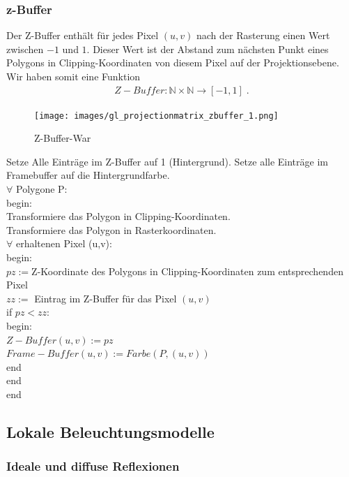 \subsubsection* {z-Buffer}
Der Z-Buffer enthält für jedes Pixel $(u,v)$ nach der Rasterung  einen Wert zwischen $-1$ und $1$. Dieser Wert  ist der Abstand zum nächsten Punkt eines Polygons  in Clipping-Koordinaten von diesem Pixel auf der Projektionsebene.  Wir haben somit eine Funktion
\begin{align*}
Z-Buffer : \mathbb{N} \times \mathbb{N} \to [-1,1]  \; .
\end{align*}

\begin{figure}[H]
    \centering
    \texttt{[image: images/gl\_projectionmatrix\_zbuffer\_1.png]}
    \caption{Z-Buffer-War}
    \label{fig:zbuffer-war}
\end{figure}



\begin{Algorithmus}
Setze Alle Einträge im Z-Buffer auf 1 (Hintergrund).
Setze alle Einträge im Framebuffer auf die Hintergrundfarbe. \\
$\forall$ Polygone P: \\
begin: \\
Transformiere das Polygon in Clipping-Koordinaten. \\
Transformiere das Polygon in Rasterkoordinaten. \\
$\forall$ erhaltenen Pixel (u,v): \\
begin: \\
$pz := $Z-Koordinate des Polygons in Clipping-Koordinaten zum entsprechenden Pixel \\
$zz:=$ Eintrag im Z-Buffer für das Pixel $(u,v)$ \\
if $pz < zz$: \\
begin: \\
$Z-Buffer(u,v) := pz$ \\
$Frame-Buffer(u,v) := Farbe(P,(u,v))$ \\
end \\
end \\
end
\end{Algorithmus}


\subsection{Lokale Beleuchtungsmodelle}
\subsubsection{Ideale und diffuse Reflexionen}
